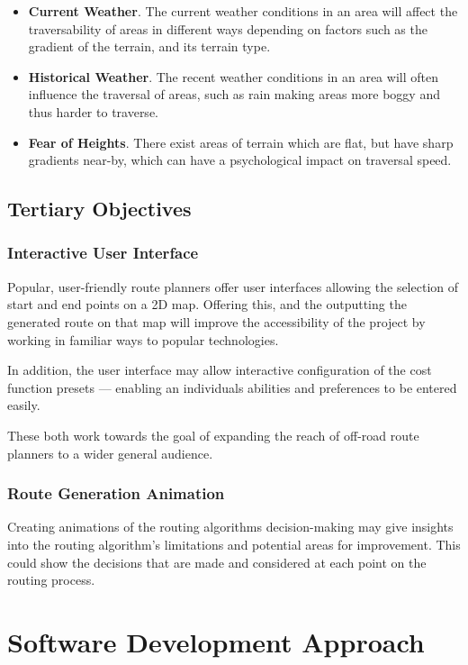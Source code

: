\documentclass[12pt]{article}
\begin{document}
\begin{itemize}
  \item \textbf{Current Weather}. The current weather conditions in an area will affect the traversability of areas in different ways depending on factors such as the gradient of the terrain, and its terrain type.
  \item \textbf{Historical Weather}. The recent weather conditions in an area will often influence the traversal of areas, such as rain making areas more boggy and thus harder to traverse.
  \item \textbf{Fear of Heights}. There exist areas of terrain which are flat, but have sharp gradients near-by, which can have a psychological impact on traversal speed.
\end{itemize}

\subsection{Tertiary Objectives}

\subsubsection{Interactive User Interface}

Popular, user-friendly route planners offer user interfaces allowing the selection of start and end points on a 2D map. Offering this, and the outputting the generated route on that map will improve the accessibility of the project by working in familiar ways to popular technologies.

In addition, the user interface may allow interactive configuration of the cost function presets --- enabling an individuals abilities and preferences to be entered easily.

These both work towards the goal of expanding the reach of off-road route planners to a wider general audience.

\subsubsection{Route Generation Animation}

Creating animations of the routing algorithms decision-making may give insights into the routing algorithm's limitations and potential areas for improvement. This could show the decisions that are made and considered at each point on the routing process.

\section{Software Development Approach}
\end{document}
